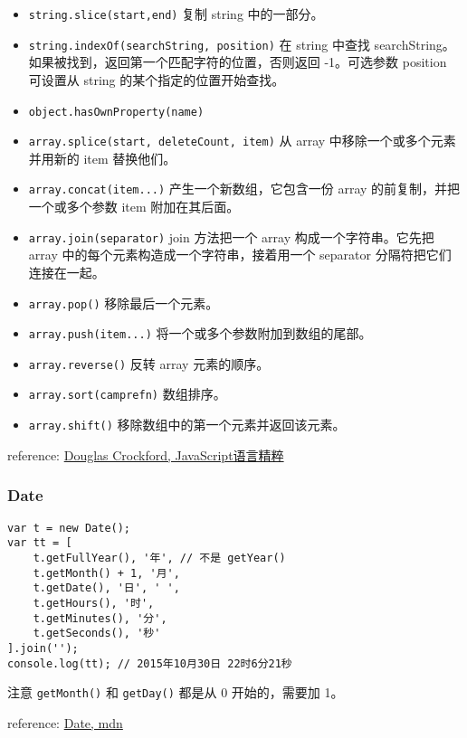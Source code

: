 \begin{itemize}
\item \texttt{string.slice(start,end)} 复制 string 中的一部分。
\item \texttt{string.indexOf(searchString, position)} 在 string 中查找 searchString。如果被找到，返回第一个匹配字符的位置，否则返回 -1。可选参数 position 可设置从 string 的某个指定的位置开始查找。
\item \texttt{object.hasOwnProperty(name)}
\item \texttt{array.splice(start, deleteCount, item)} 从 array 中移除一个或多个元素并用新的 item 替换他们。
\item \texttt{array.concat(item...)} 产生一个新数组，它包含一份 array 的前复制，并把一个或多个参数 item 附加在其后面。
\item \texttt{array.join(separator)} join 方法把一个 array 构成一个字符串。它先把 array 中的每个元素构造成一个字符串，接着用一个 separator 分隔符把它们连接在一起。
\item \texttt{array.pop()} 移除最后一个元素。
\item \texttt{array.push(item...)} 将一个或多个参数附加到数组的尾部。
\item \texttt{array.reverse()} 反转 array 元素的顺序。
\item \texttt{array.sort(camprefn)} 数组排序。
\item \texttt{array.shift()} 移除数组中的第一个元素并返回该元素。
\end{itemize}

reference: \href{http://book.douban.com/subject/11874748/}{Douglas Crockford, JavaScript语言精粹}

\subsubsection{Date}\hypertarget{date}{}\label{date}

\begin{verbatim}var t = new Date();
var tt = [
    t.getFullYear(), '年', // 不是 getYear()
    t.getMonth() + 1, '月',
    t.getDate(), '日', ' ',
    t.getHours(), '时',
    t.getMinutes(), '分',
    t.getSeconds(), '秒'
].join('');
console.log(tt); // 2015年10月30日 22时6分21秒
\end{verbatim}

注意 \texttt{getMonth()} 和 \texttt{getDay()} 都是从 0 开始的，需要加 1。

reference: \href{https://developer.mozilla.org/en-US/docs/Web/JavaScript/Reference/Global\_Objects/Date}{Date, mdn}

